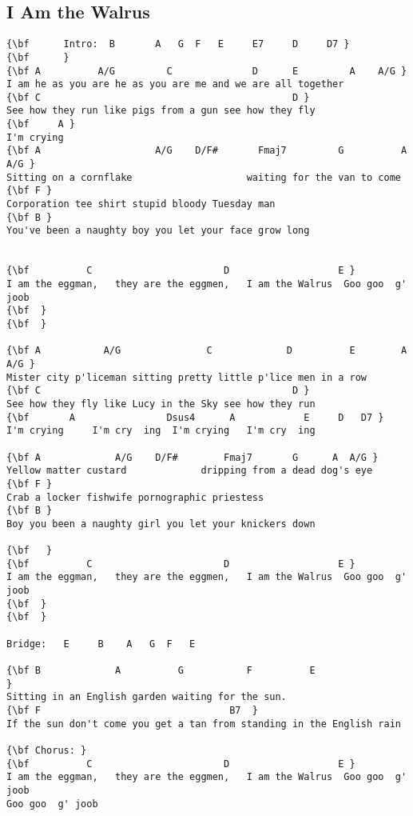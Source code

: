 \documentclass[a4paper]{article}
\begin{document}
\subsection{I Am the Walrus} %
\label{sub:I Am the Walrus}
\begin{Verbatim}[commandchars=\\\{\}]
{\bf 	  Intro:  B       A   G  F   E     E7     D     D7 }
{\bf      }
{\bf A          A/G         C              D      E         A    A/G }
I am he as you are he as you are me and we are all together 
{\bf C                                            D }
See how they run like pigs from a gun see how they fly 
{\bf     A }
I'm crying 
{\bf A                    A/G    D/F#       Fmaj7         G          A  A/G }
Sitting on a cornflake                    waiting for the van to come 
{\bf F }
Corporation tee shirt stupid bloody Tuesday man 
{\bf B }
You've been a naughty boy you let your face grow long 


{\bf          C                       D                   E }
I am the eggman,   they are the eggmen,   I am the Walrus  Goo goo  g' joob
{\bf ￼}
{\bf  }

{\bf A           A/G               C             D          E        A    A/G }
Mister city p'liceman sitting pretty little p'lice men in a row 
{\bf C                                            D }
See how they fly like Lucy in the Sky see how they run 
{\bf       A                Dsus4      A            E     D   D7 }
I'm crying     I'm cry  ing  I'm crying   I'm cry  ing 

{\bf A             A/G    D/F#        Fmaj7       G      A  A/G }
Yellow matter custard             dripping from a dead dog's eye 
{\bf F }
Crab a locker fishwife pornographic priestess  
{\bf B }
Boy you been a naughty girl you let your knickers down 

{\bf ￼￼}
{\bf          C                       D                   E }
I am the eggman,   they are the eggmen,   I am the Walrus  Goo goo  g' joob
{\bf ￼}
{\bf  }

Bridge:   E     B    A   G  F   E 

{\bf B             A          G           F          E                }
Sitting in an English garden waiting for the sun.        
{\bf F                                 B7  }
If the sun don't come you get a tan from standing in the English rain   

{\bf Chorus: }
{\bf          C                       D                   E }
I am the eggman,   they are the eggmen,   I am the Walrus  Goo goo  g' joob  
Goo goo  g' joob            


\end{Verbatim}
\end{document}
